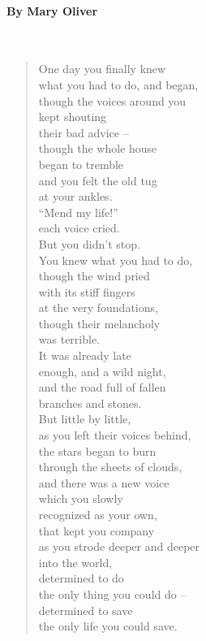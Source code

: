 \documentclass[12pt, openany, letterpaper]{memoir}
\begin{document}
\paragraph{By Mary Oliver}~
\begin{verse}
	One day you finally knew\\
	what you had to do, and began,\\
	though the voices around you\\
	kept shouting\\
	their bad advice –\\
	though the whole house\\
	began to tremble\\
	and you felt the old tug\\
	at your ankles.\\
	“Mend my life!”\\
	each voice cried.\\
	But you didn’t stop.\\
	You knew what you had to do,\\
	though the wind pried\\
	with its stiff fingers\\
	at the very foundations,\\
	though their melancholy\\
	was terrible.\\
	It was already late\\
	enough, and a wild night,\\
	and the road full of fallen\\
	branches and stones.\\
	But little by little,\\
	as you left their voices behind,\\
	the stars began to burn\\
	through the sheets of clouds,\\
	and there was a new voice\\
	which you slowly\\
	recognized as your own,\\
	that kept you company\\
	as you strode deeper and deeper\\
	into the world,\\
	determined to do\\
	the only thing you could do –\\
	determined to save\\
	the only life you could save.
\end{verse}
\end{document}
